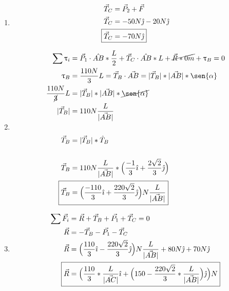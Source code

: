 \documentclass[12pt, twoside]{article}
\begin{document}
\begin{enumerate}
		\begin{enumerate}
			\item
				\begin{align*}
					\vec{T}_C &= \vec{P}_2 + \vec{F}\\
					\vec{T}_C &= -50N\hat{\jmath}-20N\hat{\jmath}\\
					\Aboxed
					{
						\vec{T}_C &= -70N\hat{\jmath}
					}
				\end{align*}
			\item
				\begin{align*}
					\sum \uptau_i &= \vec{P}_1\cdot\hat{AB}* \frac{L}{2}+
					\vec{T}_C\cdot\hat{AB}*L+
					\cancel{\vec{R}*0m}+
					\uptau_B=0\\
					\uptau_B &= \frac{110N}{3}L = \vec{T}_B \cdot\vec{AB} = |\vec{T}_B|*|\vec{AB}|*\sen{\alpha}\\
					\frac{110N}{\cancel{3}}L &= |\vec{T}_B|*|\vec{AB}|*\cancel{\sen{\alpha}}\\
					|\vec{T}_B| &= 110N\frac{L}{|\vec{AB}|}\\
					\\
					\vec{T}_B &= |\vec{T}_B|*\hat{T}_B\\
					\\
					\vec{T}_B &= 110N\frac{L}{|\vec{AB}|}*\Big{(}
					\frac{-1}{3}\hat{\imath} +
					\frac{2\sqrt{2}}{3}\hat{\jmath}
					\Big{)}\\
					\Aboxed
					{
						\vec{T}_B &= \Big{(}
						\frac{-110}{3}\hat{\imath} +
						\frac{220\sqrt{2}}{3}\hat{\jmath}
						\Big{)}N\frac{L}{|\vec{AB}|}
					}
				\end{align*}
			\item
				\begin{align*}
					\sum \vec{F}_i &= \vec{R}+\vec{T}_B+\vec{P_1}+\vec{T}_C = 0\\
					\vec{R} &= -\vec{T}_B-\vec{P_1}-\vec{T}_C\\
					\vec{R} &=
					\Big{(}
					\frac{110}{3}\hat{\imath} -
					\frac{220\sqrt{2}}{3}\hat{\jmath}
					\Big{)}N\frac{L}{|\vec{AB}|}+
					80N\hat{\jmath}+70N\hat{\jmath}\\
					\Aboxed
					{
						\vec{R} &= \Big{(}
						\frac{110}{3} * \frac{L}{|\vec{AC}|}\hat{\imath}+
						\Big{(}
						150 - \frac{220\sqrt{2}}{3} * \frac{L}{|\vec{AB}|}
						\Big{)}\hat{\jmath}
						\Big{)}N
					}
				\end{align*}
		\end{enumerate}
\end{enumerate}
\end{document}
